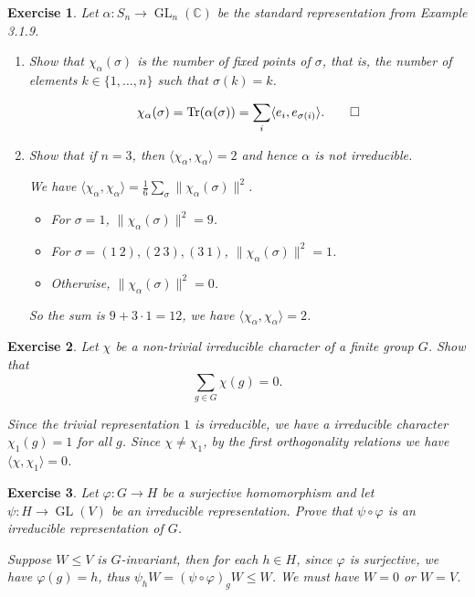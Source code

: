 \documentclass[11pt]{report}
\theoremstyle{mythm}
\let\oldendproof\endproof
\renewenvironment{proof}[1][\proofname]{%
  \oldproof[\normalfont \bfseries #1]%
}{\oldendproof}
\newtheorem{exercise}{Exercise}[chapter]
\renewcommand*{\proofname}{Proof}
\theoremstyle{myans}
\newcommand{\bbC}{\mathbb C}
\DeclareMathOperator{\Tr}{Tr}
\DeclareMathOperator{\GL}{GL}
\newcommand{\ang}[1]{\langle #1 \rangle}
\newcommand{\norm}[1]{\| #1 \|}
\begin{document}
\begin{exercise}
  Let $\alpha\colon S_n \to \GL_n(\bbC)$ be the standard representation from
  Example 3.1.9.
  \begin{enumerate}
    \item Show that $\chi_\alpha(\sigma)$ is the number of fixed points of $\sigma$, that is, the number of
    elements $k \in \{1, \dots , n\}$ such that $\sigma(k) = k$.
    \begin{proof}
      \[ \chi_\alpha(\sigma) = \Tr (\alpha(\sigma)) = \sum_{i} \ang{e_i, e_{\sigma(i)}}. \qedhere \]
    \end{proof}
    \item Show that if $n = 3$, then $\ang{\chi_\alpha, \chi_\alpha} = 2$ and hence $\alpha$ is not irreducible.
    \begin{proof}
      We have $\ang{\chi_\alpha, \chi_\alpha} = \frac 1{6} \sum_{\sigma} \|\chi_\alpha(\sigma)\|^2$.
      \begin{itemize}
        \item For $\sigma = 1$, $\norm{\chi_\alpha(\sigma)}^2 = 9$.
        \item For $\sigma = (1\ 2), (2\ 3), (3\ 1)$, $\norm{\chi_\alpha(\sigma)}^2 = 1$.
        \item Otherwise, $\norm{\chi_\alpha(\sigma)}^2 = 0$.
      \end{itemize}
      So the sum is $9 + 3\cdot 1 = 12$, we have $\ang{\chi_\alpha, \chi_\alpha} = 2$.
    \end{proof}
  \end{enumerate}
\end{exercise}

\begin{exercise}
  Let $\chi$ be a non-trivial irreducible character of a finite group $G$. Show
  that
  \[ \sum_{g\in G} \chi(g) = 0. \]
  \begin{proof}
    Since the trivial representation $1$ is irreducible, we have a irreducible character $\chi_1(g) = 1$
    for all $g$. Since $\chi\neq \chi_1$, by the first orthogonality relations we have
    $\ang{\chi, \chi_1} = 0$.
  \end{proof}
\end{exercise}

\begin{exercise}
  Let $\varphi\colon G\to H$ be a surjective homomorphism and let
  $\psi \colon H\to \GL(V )$ be an irreducible representation. Prove that $\psi \circ \varphi$ is an irreducible
  representation of $G$.
  \begin{proof}
    Suppose $W\leq V$ is $G$-invariant, then for each $h\in H$, since $\varphi$ is surjective, we have
    $\varphi(g) =h$, thus $\psi_h W = (\psi \circ \varphi)_g W \leq W$. We must have $W = 0$ or $W = V$.
  \end{proof}
\end{exercise}
\end{document}
